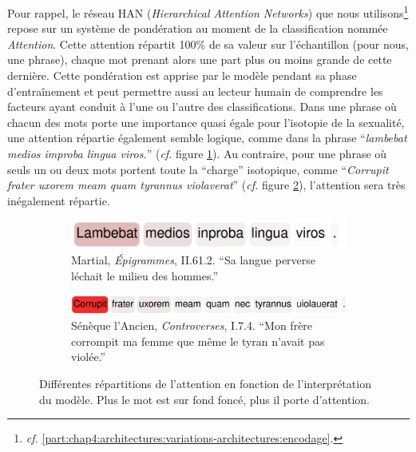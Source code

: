 
Pour rappel, le réseau HAN (\textit{Hierarchical Attention Networks}) que nous utilisons\footnote{\textit{cf.} \ref{part:chap4:architectures:variations-architectures:encodage}.} repose sur un système de pondération au moment de la classification nommée \textit{Attention}. Cette attention répartit 100\% de sa valeur sur l'échantillon (pour nous, une phrase), chaque mot prenant alors une part plus ou moins grande de cette dernière. Cette pondération est apprise par le modèle pendant sa phase d'entraînement et peut permettre aussi au lecteur humain de comprendre les facteurs ayant conduit à l'une ou l'autre des classifications. Dans une phrase où chacun des mots porte une importance quasi égale pour l'isotopie de la sexualité, une attention répartie également semble logique, comme dans la phrase \enquote{\textit{lambebat medios improba lingua viros.}} (\textit{cf.} figure \ref{fig:chap4:attention:repartie}). Au contraire, pour une phrase où seuls un ou deux mots portent toute la \enquote{charge} isotopique, comme \enquote{\textit{Corrupit frater uxorem meam quam tyrannus violaverat}} (\textit{cf.} figure \ref{fig:chap4:attention:mono}), l'attention sera très inégalement répartie.

\begin{figure}
     \centering
     \begin{subfigure}[t]{0.45\textwidth}
         \centering
         \includegraphics[width=\textwidth]{figures/chap4/attention.png}
         \caption{Martial, \textit{Épigrammes}, II.61.2. \enquote{Sa langue perverse léchait le milieu des hommes.}}
         \label{fig:chap4:attention:repartie}
     \end{subfigure}
     \hfill
     \begin{subfigure}[t]{0.45\textwidth}
         \centering
         \includegraphics[width=\textwidth]{figures/chap4/attention2.png}
         \caption{Sénèque l'Ancien, \textit{Controverses}, I.7.4. \enquote{Mon frère corrompit ma femme que même le tyran n'avait pas violée.}}
         \label{fig:chap4:attention:mono}
     \end{subfigure}
    \caption{Différentes répartitions de l'attention en fonction de l'interprétation du modèle. Plus le mot est sur fond foncé, plus il porte d'attention.}
    \label{fig:chap4:attention}
\end{figure}


